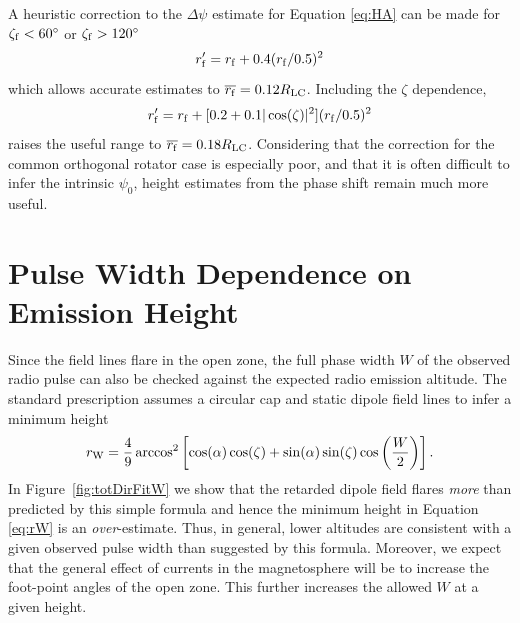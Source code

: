 	A heuristic correction to the $\Delta \psi$ estimate for Equation \ref{eq:HA} can be made
for $\zeta_{\rm{f}} <60^\circ$ or $\zeta_{\rm{f}} >120^\circ$
\begin{equation}\label{eq:DPsi1}
r_{\rm{f}}' = r_{\rm{f}}+ 0.4 (r_{\rm{f}}/0.5)^{2}
\end{equation}
which allows accurate estimates to $\overline{r_{\rm{f}}}=0.12R_{\rm{LC}}$. Including the $\zeta$ dependence,
\begin{equation}\label{eq:DPsi2}
r_{\rm{f}}' = r_{\rm{f}}+ [0.2 +0.1 |\cos(\zeta)|^{2}] (r_{\rm{f}}/0.5)^{2}
\end{equation}
raises the useful range to $\overline{r_{\rm{f}}}=0.18R_{\rm{LC}}$. Considering that the correction 
for the common orthogonal rotator case is especially poor, and that it is often 
difficult to infer the intrinsic $\psi_0$,
height estimates from the phase shift remain much more useful.

\section{Pulse Width Dependence on Emission Height}\label{sec:rW}
\label{sec:heightFromWidth}

	Since the field lines flare in the open zone, the full phase width $W$ of the
observed radio pulse can also be checked against the expected radio emission
altitude. The standard prescription assumes a circular cap and static dipole field
lines to infer a minimum height
\begin{equation}\label{eq:rW}
r_{\rm{W}}=\frac{4}{9}\arccos^{2}\left[\cos(\alpha)\cos(\zeta)+\sin(\alpha)\sin(\zeta)\cos\left(\frac{W}{2}\right)\right].
\end{equation}
In Figure~\ref{fig:totDirFitW} we show that the retarded dipole field flares
{\it more} than predicted by this simple formula and hence the minimum height
in Equation \ref{eq:rW} is an {\it over}-estimate. Thus, in general, lower
altitudes are consistent with a given observed pulse width than suggested by this
formula. Moreover, we expect that the general effect of currents in the magnetosphere
will be to increase the foot-point angles of the open zone.
This further increases the allowed
$W$ at a given height.

